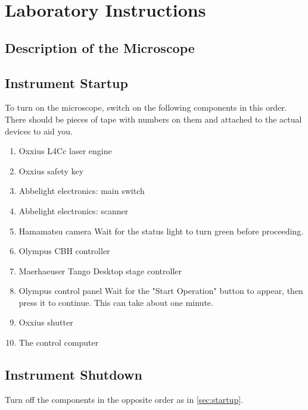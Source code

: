 \documentclass[10pt,a4paper,oneside]{book}
\begin{document}
\chapter{Laboratory Instructions}

\section{Description of the Microscope}

\section{Instrument Startup}\label{sec:startup}

To turn on the microscope, switch on the following components in this order. There should be pieces of tape with numbers on them and attached to the actual devices to aid you.

\begin{enumerate}
    \item Oxxius L4Cc laser engine
    \item Oxxius safety key
    \item Abbelight electronics: main switch
    \item Abbelight electronics: scanner
    \item Hamamatsu camera \newline Wait for the status light to turn green before proceeding.
    \item Olympus CBH controller
    \item Maerhaeuser Tango Desktop stage controller
    \item Olympus control panel \newline Wait for the "Start Operation" button to appear, then press it to continue. This can take about one minute.
    \item Oxxius shutter
    \item The control computer
\end{enumerate}

\section{Instrument Shutdown}

Turn off the components in the opposite order as in \autoref{sec:startup}.
\end{document}
